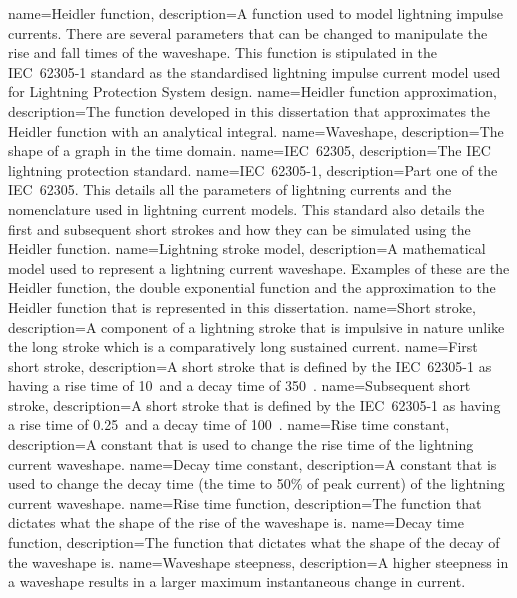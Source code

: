 {
    name=Heidler function,
    description={A function used to model lightning impulse currents. There are several parameters that can be changed to manipulate the rise and fall times of the waveshape. This function is stipulated in the IEC~62305-1 standard as the standardised lightning impulse current model used for Lightning Protection System design.}
}
{
    name=Heidler function approximation,
    description={The function developed in this dissertation that approximates the Heidler function with an analytical integral.}
}
{
    name=Waveshape,
    description={The shape of a graph in the time domain.}
}
{
    name=IEC~62305,
    description={The IEC lightning protection standard.}
}
{
    name=IEC~62305-1,
    description={Part one of the IEC~62305. This details all the parameters of lightning currents and the nomenclature used in lightning current models. This standard also details the first and subsequent short strokes and how they can be simulated using the Heidler function.}
}
{
    name=Lightning stroke model,
    description={A mathematical model used to represent a lightning current waveshape. Examples of these are the Heidler function, the double exponential function and the approximation to the Heidler function that is represented in this dissertation.}
}
{
    name=Short stroke,
    description={A component of a lightning stroke that is impulsive in nature unlike the long stroke which is a comparatively long sustained current.}
}
{
    name=First short stroke,
    description={A short stroke that is defined by the IEC~62305-1 as having a rise time of 10~\usec and a decay time of 350~\usec.}
}
{
    name=Subsequent short stroke,
    description={A short stroke that is defined by the IEC~62305-1 as having a rise time of 0.25~\usec and a decay time of 100~\usec.}
}
{
    name=Rise time constant,
    description={A constant that is used to change the rise time of the lightning current waveshape.}
}
{
    name=Decay time constant,
    description={A constant that is used to change the decay time (the time to 50\% of peak current) of the lightning current waveshape.}
}
{
    name=Rise time function,
    description={The function that dictates what the shape of the rise of the waveshape is.}
}
{
    name=Decay time function,
    description={The function that dictates what the shape of the decay of the waveshape is.}
}
{
    name=Waveshape steepness,
    description={A higher steepness in a waveshape results in a larger maximum instantaneous change in current.}
}
